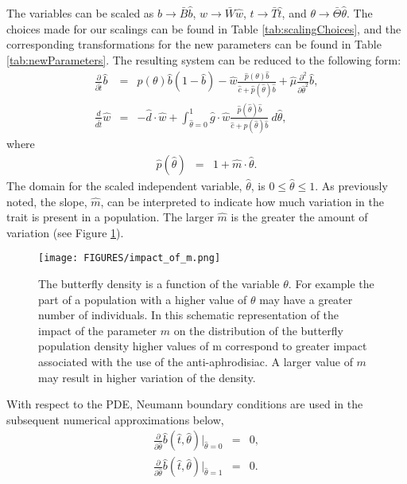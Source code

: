\documentclass[review,authoryear]{elsarticle}
\newcommand{\origB}{{b}}
\newcommand{\origW}{{w}}
\newcommand{\origTheta}{{\theta}}
\newcommand{\origT}{{t}}
\newcommand{\scaledB}{\hat{b}}
\newcommand{\scaledW}{\hat{w}}
\newcommand{\scaledC}{\hat{c}}
\newcommand{\scaledD}{\hat{d}}
\newcommand{\scaledG}{\hat{g}}
\newcommand{\scaledP}[1]{\hat{p}(#1)}
\newcommand{\scaledTheta}{\hat{\theta}}
\newcommand{\scaledT}{\hat{t}}
\newcommand{\scaledMu}{\hat{\mu}}
\newcommand{\scaledM}{\hat{m}}
\begin{document}
The variables can be scaled as $\origB\rightarrow \bar{B}\scaledB$,
$\origW\rightarrow \bar{W}\scaledW$, $\origT\rightarrow \bar{T}\scaledT$, and
$\origTheta\rightarrow \bar{\Theta}\scaledTheta$. The choices made for our
scalings can be found in Table \ref{tab:scalingChoices}, and the
corresponding transformations for the new parameters can be found in
Table \ref{tab:newParameters}.  The resulting system can be reduced to
the following form:
\begin{eqnarray}
  \label{eq:scaledodePDE1}
  \frac{\partial}{\partial \scaledT} \scaledB & = &
      p(\theta) \scaledB (1 - \scaledB)
      -  \scaledW \frac{\scaledP{\theta} \scaledB}{\scaledC+\scaledP{\scaledTheta}\scaledB}
      + \scaledMu \frac{\partial^2}{\partial \scaledTheta^2} \scaledB , \\
  \label{eq:scaledodePDE2}
  \frac{d}{d\scaledT} \scaledW & = & -\scaledD \cdot \scaledW +
      \int^1_{\scaledTheta=0} \scaledG \cdot \scaledW \frac{\scaledP{\scaledTheta} \scaledB }{\scaledC + \scaledP{\scaledTheta} \scaledB} ~ d\scaledTheta,
\end{eqnarray}
where
\begin{eqnarray}
    \label{eq:definitionP}
  \scaledP{\scaledTheta} & = & 1 + \scaledM \cdot \scaledTheta.
\end{eqnarray}
The domain for the scaled independent variable, $\scaledTheta$, is
$0\leq\scaledTheta\leq 1$. As previously noted, the slope, $\scaledM$, can be
interpreted to indicate how much variation in the trait is present in
a population. The larger $\scaledM$ is the greater the amount of variation (see Figure \ref{fig:impact_of_m}).
\begin{figure}[htb]
  \centering
  \texttt{[image: FIGURES/impact\_of\_m.png]}
  \caption[Schematic representation of the impact of the parameter $m$.]{The butterfly density is a function of the variable $\origTheta$. For example the part of a population with a higher value of $\origTheta$ may have a greater number of individuals. In this schematic representation of the impact of the parameter $m$ on the distribution of the butterfly population density  higher values of m correspond to greater impact associated with the use of the anti-aphrodisiac. A larger value of $m$ may result in higher variation of the density.}
  \label{fig:impact_of_m}
\end{figure}
With respect to the PDE, Neumann boundary conditions are used in the
subsequent numerical approximations below,
\begin{eqnarray*}
  \frac{\partial}{\partial\scaledTheta} \scaledB(\scaledT,\scaledTheta) \bigg|_{\scaledTheta=0} & = & 0, \\
  \frac{\partial}{\partial\scaledTheta} \scaledB(\scaledT,\scaledTheta) \bigg|_{\scaledTheta=1} & = & 0. \\
\end{eqnarray*}
\end{document}
